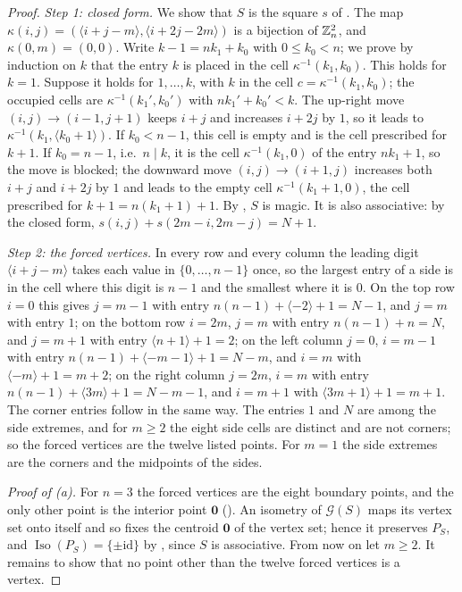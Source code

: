 \begin{proof}
\emph{Step 1: closed form.}
We show that $S$ is the square $s$ of .
The map $\kappa(i,j)=(\langle i+j-m\rangle,\langle i+2j-2m\rangle)$ is a bijection of $\mathbb{Z}_n^2$, and $\kappa(0,m)=(0,0)$.
Write $k-1=nk_1+k_0$ with $0\le k_0<n$; we prove by induction on $k$ that the entry $k$ is placed in the cell $\kappa^{-1}(k_1,k_0)$.
This holds for $k=1$. Suppose it holds for $1,\dots,k$, with $k$ in the cell $c=\kappa^{-1}(k_1,k_0)$; the occupied cells are $\kappa^{-1}(k_1',k_0')$ with $nk_1'+k_0'<k$.
The up-right move $(i,j)\to(i-1,j+1)$ keeps $i+j$ and increases $i+2j$ by $1$, so it leads to $\kappa^{-1}(k_1,\langle k_0+1\rangle)$.
If $k_0<n-1$, this cell is empty and is the cell prescribed for $k+1$.
If $k_0=n-1$, i.e.\ $n\mid k$, it is the cell $\kappa^{-1}(k_1,0)$ of the entry $nk_1+1$, so the move is blocked; the downward move $(i,j)\to(i+1,j)$ increases both $i+j$ and $i+2j$ by $1$ and leads to the empty cell $\kappa^{-1}(k_1+1,0)$, the cell prescribed for $k+1=n(k_1+1)+1$.
By , $S$ is magic. It is also associative: by the closed form, $s(i,j)+s(2m-i,2m-j)=N+1$.

\emph{Step 2: the forced vertices.}
In every row and every column the leading digit $\langle i+j-m\rangle$ takes each value in $\{0,\dots,n-1\}$ once, so the largest entry of a side is in the cell where this digit is $n-1$ and the smallest where it is $0$.
On the top row $i=0$ this gives $j=m-1$ with entry $n(n-1)+\langle-2\rangle+1=N-1$, and $j=m$ with entry $1$; on the bottom row $i=2m$, $j=m$ with entry $n(n-1)+n=N$, and $j=m+1$ with entry $\langle n+1\rangle+1=2$; on the left column $j=0$, $i=m-1$ with entry $n(n-1)+\langle-m-1\rangle+1=N-m$, and $i=m$ with $\langle-m\rangle+1=m+2$; on the right column $j=2m$, $i=m$ with entry $n(n-1)+\langle3m\rangle+1=N-m-1$, and $i=m+1$ with $\langle3m+1\rangle+1=m+1$.
The corner entries follow in the same way.
The entries $1$ and $N$ are among the side extremes, and for $m\ge2$ the eight side cells are distinct and are not corners; so the forced vertices are the twelve listed points. For $m=1$ the side extremes are the corners and the midpoints of the sides.

\emph{Proof of (a).} For $n=3$ the forced vertices are the eight boundary points, and the only other point is the interior point $\mathbf 0$ (). An isometry of $\mathcal G(S)$ maps its vertex set onto itself and so fixes the centroid $\mathbf 0$ of the vertex set; hence it preserves $P_S$, and $\operatorname{Iso}(P_S)=\{\pm\mathrm{id}\}$ by , since $S$ is associative.
From now on let $m\ge2$. It remains to show that no point other than the twelve forced vertices is a vertex.


\end{proof}
